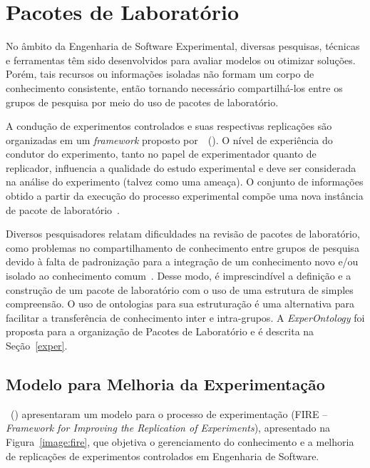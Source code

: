 \chapter{Pacotes de Laboratório}
\label{cp:pacotes}
No âmbito da Engenharia de Software Experimental, diversas pesquisas, técnicas e ferramentas têm sido  desenvolvidos para avaliar modelos ou otimizar soluções. Porém, tais recursos ou informações isoladas não formam um corpo de conhecimento consistente, então tornando necessário compartilhá-los entre os grupos de pesquisa por meio do uso de pacotes de laboratório.

A condução de experimentos controlados e suas respectivas replicações são organizadas em um \textit{framework} proposto por~~(\citeyear{mendoncca2008framework}). O nível de experiência do condutor do experimento, tanto no papel de experimentador quanto de replicador, influencia a qualidade do estudo experimental e deve ser considerada na análise do experimento (talvez como uma ameaça). O conjunto de informações obtido a partir da execução do processo experimental compõe uma nova instância de pacote de laboratório~\cite{Garcia08}.

Diversos pesquisadores relatam dificuldades na revisão de pacotes de laboratório, como problemas no compartilhamento de conhecimento entre grupos de pesquisa devido à falta de padronização para a integração de um conhecimento novo e/ou isolado ao conhecimento comum~\cite{Scatalon11}. Desse modo, é imprescindível a definição e a construção de um pacote de laboratório com o uso de uma estrutura de simples compreensão. O uso de ontologias para sua estruturação é uma alternativa para facilitar a transferência de conhecimento inter e intra-grupos. A \textit{ExperOntology} foi proposta para a organização de Pacotes de Laboratório e é descrita na Seção~\ref{exper}.

\section{Modelo para Melhoria da Experimentação}
\label{fire}

~(\citeyear{mendoncca2008framework}) apresentaram um modelo para o processo de experimentação (FIRE – \textit{Framework for Improving the Replication of Experiments}), apresentado na Figura~\ref{image:fire}, que objetiva o gerenciamento do conhecimento e a melhoria de replicações de experimentos controlados em Engenharia de Software.

